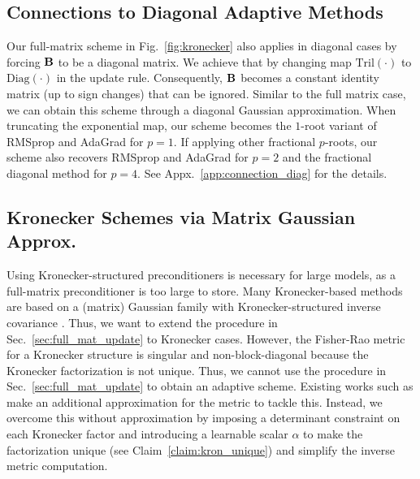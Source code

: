 \subsection{
Connections to Diagonal Adaptive  Methods}
\label{sec:diag_case_rgd}
\vspace{-0.2cm}
Our full-matrix scheme in Fig.~\ref{fig:kronecker} also applies in diagonal cases by forcing $\mbox{$\mbox{$\mathbf{B}$}$}$ to be a diagonal matrix. 
We achieve that by changing map $\mathrm{Tril}(\cdot)$ to $\mathrm{Diag}(\cdot)$ in the update rule. Consequently, $\mbox{$\mbox{$\mathbf{B}$}$}$ becomes a constant identity matrix (up to sign changes) that can be ignored.
Similar to the full matrix case, we can obtain this scheme through a diagonal Gaussian approximation.
When truncating the exponential map, our scheme becomes the 
$1$-root variant of RMSprop and AdaGrad  \citep{lincan2024} for $p=1$.
If applying other fractional $p$-roots, our scheme also recovers RMSprop and AdaGrad for $p=2$ and the fractional diagonal method \citep{chen2021closing} for $p=4$. See Appx.~\ref{app:connection_diag} for the details.




\vspace{-0.35cm}
\subsection{Kronecker Schemes via Matrix Gaussian Approx.}
\label{sec:mat_gauss_nn}
\vspace{-0.2cm}
Using Kronecker-structured preconditioners \citep{martens2015optimizing,li2017preconditioned,
gupta18shampoo} is necessary for large models, as a full-matrix preconditioner is too large to store.
Many Kronecker-based methods \citep{zhang2018noisy,ren2021tensor,lin2023simplifying,lincan2024} are based on a (matrix) Gaussian family with Kronecker-structured inverse covariance .
Thus, we want to extend the procedure in Sec.~\ref{sec:full_mat_update} to Kronecker cases. 
However, the Fisher-Rao metric for a Kronecker structure is singular
and non-block-diagonal because the Kronecker factorization is not unique.
Thus, we cannot use the procedure in Sec.~\ref{sec:full_mat_update} to obtain an adaptive scheme.
%
%
%
Existing works such as \citet{zhang2018noisy,
lin2019fast,
lincan2024} make an additional approximation for the metric to tackle this.
Instead, we overcome this without approximation by imposing a determinant constraint on each Kronecker factor and introducing a learnable scalar $\alpha$ to make the factorization unique (see  Claim~\ref{claim:kron_unique}) and simplify the inverse metric computation.


